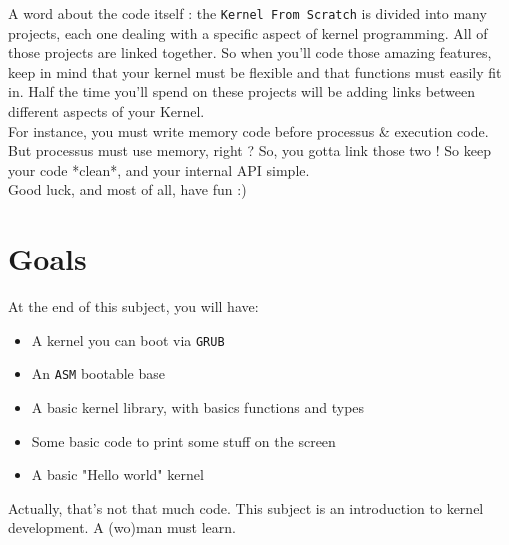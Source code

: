 \documentclass{42-en}
\begin{document}
	A word about the code itself : the \texttt{Kernel From Scratch} is divided into many projects,
    each one dealing with a specific aspect of kernel programming. All
    of those projects are linked together. So when you'll code those
    amazing features, keep in mind that your kernel must be flexible
    and that functions must easily fit in. Half the time you'll spend
    on these projects will be adding links between different aspects
    of your Kernel.\\

	For instance, you must write memory code before processus \& execution code.
	But processus must use memory, right ? So, you gotta link those two !
	So keep your code *clean*, and your internal API simple.\\

	Good luck, and most of all, have fun :)

\newpage
\chapter{Goals}

	At the end of this subject, you will have:

	\begin{itemize}\itemsep1pt
		\item A kernel you can boot via \texttt{GRUB}
		\item An \texttt{ASM} bootable base
		\item A basic kernel library, with basics functions and types
		\item Some basic code to print some stuff on the screen
		\item A basic "Hello world" kernel
	\end{itemize}

	Actually, that's not that much code. This subject is an
    introduction to kernel development. A (wo)man must learn.



\newpage
\end{document}
